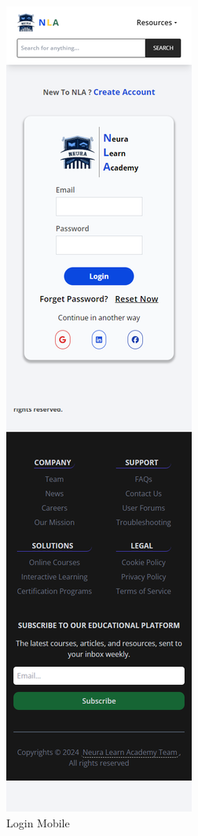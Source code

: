 \begin{figure}[h!]
	\centering
	\includegraphics[max height=\textheight,max width=\textwidth]{figures/frontend/login mobile.png}
	\caption{Login Mobile}
\end{figure}

